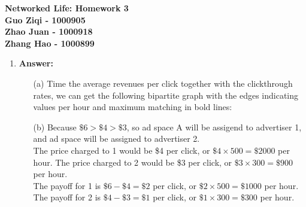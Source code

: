 \documentclass[12pt]{article}
\begin{document}
\begin{center}
\large\bf Networked Life: Homework 3
\medskip\\
Guo Ziqi - 1000905\\
Zhao Juan - 1000918\\
Zhang Hao - 1000899
\end{center}

\begin{enumerate}

\item{} \textbf{Answer:}\\
\begin{itemize}
\item[(a)] Time the average revenues per click together with the clickthrough rates, we can get the following bipartite graph with the edges indicating values per hour and maximum matching in bold lines:
\bigskip\\
\begin{center}
\end{center}

\item[(b)] Because $\$6>\$4>\$3$, so ad space A will be assigend to advertiser 1, and ad space will be assigned to advertiser 2.
\medskip\\
The price charged to 1 would be \$4 per click, or $\$4\times500=\$2000$ per hour. The price charged to 2 would be \$3 per click, or $\$3\times300=\$900$ per hour.
\medskip\\
The payoff for 1 is $\$6-\$4=\$2$ per click, or $\$2\times500=\$1000$ per hour. The payoff for 2 is $\$4-\$3=\$1$ per click, or $\$1\times300=\$300$ per hour.
\end{itemize}


\end{enumerate}
\end{document}
